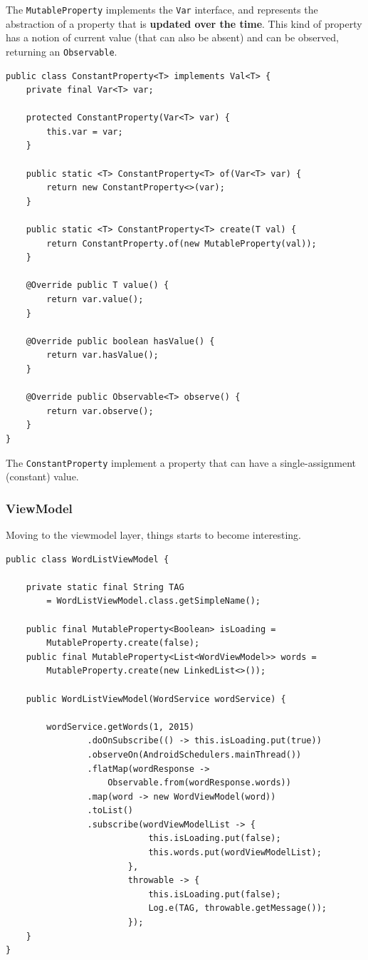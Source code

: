 The \texttt{MutableProperty} implements the \texttt{Var} interface, and
represents the abstraction of a property that is \textbf{updated over
the time}. This kind of property has a notion of current value (that can
also be absent) and can be observed, returning an \texttt{Observable}.

\begin{verbatim}
public class ConstantProperty<T> implements Val<T> {
    private final Var<T> var;

    protected ConstantProperty(Var<T> var) {
        this.var = var;
    }

    public static <T> ConstantProperty<T> of(Var<T> var) {
        return new ConstantProperty<>(var);
    }

    public static <T> ConstantProperty<T> create(T val) {
        return ConstantProperty.of(new MutableProperty(val));
    }

    @Override public T value() {
        return var.value();
    }

    @Override public boolean hasValue() {
        return var.hasValue();
    }

    @Override public Observable<T> observe() {
        return var.observe();
    }
}
\end{verbatim}

The \texttt{ConstantProperty} implement a property that can have a
single-assignment (constant) value.

\subsubsection{ViewModel}\label{viewmodel}

Moving to the viewmodel layer, things starts to become interesting.

\begin{verbatim}
public class WordListViewModel {

    private static final String TAG 
    	= WordListViewModel.class.getSimpleName();

    public final MutableProperty<Boolean> isLoading =
        MutableProperty.create(false);
    public final MutableProperty<List<WordViewModel>> words =
        MutableProperty.create(new LinkedList<>());

    public WordListViewModel(WordService wordService) {

        wordService.getWords(1, 2015)
                .doOnSubscribe(() -> this.isLoading.put(true))
                .observeOn(AndroidSchedulers.mainThread())
                .flatMap(wordResponse ->
                    Observable.from(wordResponse.words))
                .map(word -> new WordViewModel(word))
                .toList()
                .subscribe(wordViewModelList -> {
                            this.isLoading.put(false);
                            this.words.put(wordViewModelList);
                        },
                        throwable -> {
                            this.isLoading.put(false);
                            Log.e(TAG, throwable.getMessage());
                        });
    }
}
\end{verbatim}

